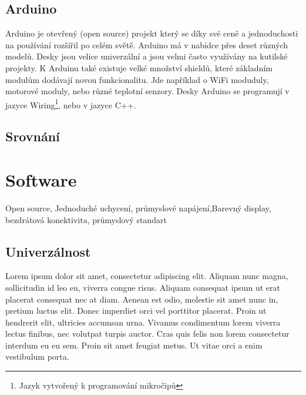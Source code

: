 \subsection{Arduino}
Arduino \cite{ARDUGREENHOUSE} je otevřený (open source) projekt který se díky své ceně a jednoduchosti na používání rozšířil po celém světě.
Arduino má v nabídce přes deset různých modelů. Desky jsou velice univerzální a jsou velmi často využívány na kutilské projekty.
K Arduinu také existuje velké množství shieldů, které základním modulům dodávají novou funkcionalitu. 
Jde například o WiFi moduduly, motorové moduly, nebo různé teplotní senzory.
Desky Arduino se programují v jazyce Wiring\footnote{Jazyk vytvořený k programování mikročipů}, nebo v jazyce C++. 

\fxnote[author=JA]{\textcolor{mygreen}{Obrázek Arduina}}


\subsection{Srovnání}



\section{Software}

Open source, Jednoduché uchycení, průmyslové napájení,Barevný display, bezdrátová konektivita, průmyslový standart


\subsection{Univerzálnost}
Lorem ipsum dolor sit amet, consectetur adipiscing elit.
Aliquam nunc magna, sollicitudin id leo eu, viverra congue risus.
Aliquam consequat ipsum ut erat placerat consequat nec at diam. 
Aenean est odio, molestie sit amet nunc in, pretium luctus elit. 
Donec imperdiet orci vel porttitor placerat. 
Proin ut hendrerit elit, ultricies accumsan urna. 
Vivamus condimentum lorem viverra lectus finibus, nec volutpat turpis auctor.
Cras quis felis non lorem consectetur interdum eu eu sem. 
Proin sit amet feugiat metus. 
Ut vitae orci a enim vestibulum porta. 
\newpage